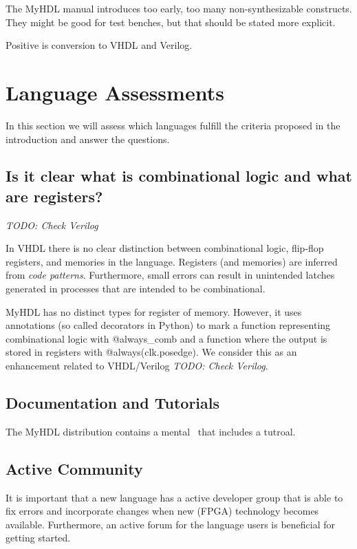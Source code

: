 \documentclass[10pt, conference, compsocconf]{IEEEtran}
\newcommand{\code}[1]{{\small{\textsf{#1}}}}
\newcommand{\todo}[1]{{\emph{TODO: #1}}}
\begin{document}
The MyHDL manual introduces too early, too many non-synthesizable constructs.
They might be good for test benches, but that should be stated more explicit.

Positive is conversion to VHDL and Verilog.

\section{Language Assessments}

In this section we will assess which languages fulfill the criteria proposed in
the introduction and answer the questions.

\subsection{Is it clear what is combinational logic and what are registers?}

\todo{Check Verilog}

In VHDL there is no clear distinction between combinational logic, flip-flop
registers,  and memories in the language. Registers (and memories) are
inferred from \emph{code patterns}. Furthermore, small errors can result
in unintended latches generated in processes that are intended to be combinational.

MyHDL has no distinct types for register of memory. However, it uses annotations
(so called decorators in Python) to mark a function representing
combinational logic with \code{@always\_comb} and a function where the
output is stored in registers with \code{@always(clk.posedge)}. We consider
this as an enhancement related to VHDL/Verilog \todo{Check Verilog}.

\subsection{Documentation and Tutorials}

The MyHDL distribution contains a mental~\cite{myhdl:2010} that includes
a tutroal.

\subsection{Active Community}

It is important that a new language has a active developer group that is
able to fix errors and incorporate changes when new (FPGA) technology
becomes available. Furthermore, an active forum for the language users
is beneficial for getting started.
\end{document}
